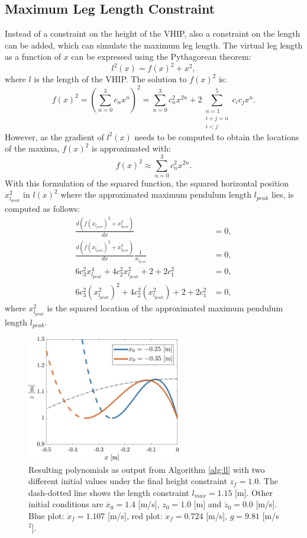 \subsection{Maximum Leg Length Constraint}
Instead of a constraint on the height of the \ac{VHIP}, also a constraint on the length can be added, which can simulate the maximum leg length. The virtual leg length as a function of $x$ can be expressed using the Pythagorean theorem:
\begin{equation}
	l^2(x) = f(x)^2 + x^2,
\end{equation}
where $l$ is the length of the \ac{VHIP}. The solution to $f(x)^2$ is:
\begin{equation}
f(x)^2=(\sum_{n=0}^3 c_n x^n)^2 = \sum_{n=0}^3 c_n^2 x^{2n} + 2\sum_{\substack{n=1 \\ i+j=n \\ i < j}}^5 c_i c_j x^n. 
\end{equation}
However, as the gradient of $l^2(x)$ needs to be computed to obtain the locations of the maxima, $f(x)^2$ is approximated with:
\begin{equation*}
	f(x)^2\approx \sum_{n=0}^3 c_n^2 x^{2n}.
\end{equation*}
With this formulation of the squared function, the squared horizontal position $x_{l_{peak}}^2$ in $l(x)^2$ where the approximated maximum pendulum length $l_{peak}$ lies, is computed as follows:
\begin{align}
	\frac{d(f(x_{l_{peak}})^2+x_{l_{peak}}^2)}{dx}&=0,\\
	\frac{d(f(x_{l_{peak}})^2+x_{l_{peak}}^2)}{dx}\frac{1}{x_{l_{peak}}}&=0,\\
	6c_3^2 x_{l_{peak}}^4 + 4 c_2^2 x_{l_{peak}}^2 + 2+2c_1^2 &= 0,\\
	6c_3^2 (x_{l_{peak}}^2)^2 + 4 c_2^2 (x_{l_{peak}}^2) + 2+2c_1^2 &= 0,
\end{align}
where $x_{l_{peak}}^2$ is the squared location of the approximated maximum pendulum length $l_{peak}$.
\begin{figure}
\centering
\includegraphics[width=0.6\textwidth]{STYLESTUFF/polynomialLengthViz.png}
\caption{Resulting polynomials as output from Algorithm \ref{alg:ll} with two different initial values under the final height constraint $z_f=1.0$. The dash-dotted line shows the length constraint $l_{max}=1.15$ [m]. Other initial conditions are $\dot{x}_0=1.4$ [m/s], $z_0=1.0$ [m] and $\dot{z}_0=0.0$ [m/s]. Blue plot: $\dot{x}_f=1.107$ [m/s], red plot: $\dot{x}_f=0.724$ [m/s], $g=9.81$ [m/s$^2$]. }
\label{fig:pollength}
\end{figure}

